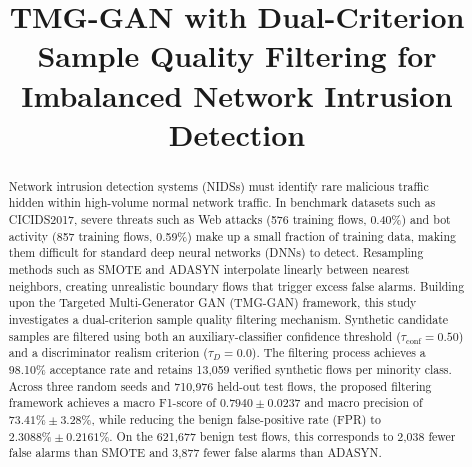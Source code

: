 \documentclass[conference]{IEEEtran}
\begin{document}
\title{TMG-GAN with Dual-Criterion Sample Quality Filtering for Imbalanced Network Intrusion Detection}

\author{
}

\maketitle

\begin{abstract}
Network intrusion detection systems (NIDSs) must identify rare malicious traffic hidden within high-volume normal network traffic. In benchmark datasets such as CICIDS2017, severe threats such as Web attacks (576 training flows, 0.40\%) and bot activity (857 training flows, 0.59\%) make up a small fraction of training data, making them difficult for standard deep neural networks (DNNs) to detect. Resampling methods such as SMOTE and ADASYN interpolate linearly between nearest neighbors, creating unrealistic boundary flows that trigger excess false alarms. Building upon the Targeted Multi-Generator GAN (TMG-GAN) framework, this study investigates a dual-criterion sample quality filtering mechanism. Synthetic candidate samples are filtered using both an auxiliary-classifier confidence threshold ($\tau_{\text{conf}} = 0.50$) and a discriminator realism criterion ($\tau_D = 0.0$). The filtering process achieves a 98.10\% acceptance rate and retains 13,059 verified synthetic flows per minority class. Across three random seeds and 710,976 held-out test flows, the proposed filtering framework achieves a macro F1-score of $0.7940 \pm 0.0237$ and macro precision of $73.41\% \pm 3.28\%$, while reducing the benign false-positive rate (FPR) to $2.3088\% \pm 0.2161\%$. On the 621,677 benign test flows, this corresponds to 2,038 fewer false alarms than SMOTE and 3,877 fewer false alarms than ADASYN.
\end{abstract}
\end{document}
